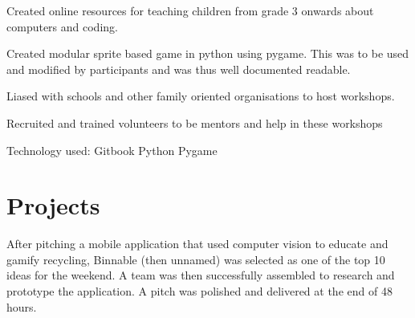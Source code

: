 \documentclass[a4paper]{deedy-resume} %
\begin{document}
\begin{minipage}[t]{0.66\textwidth}
\sectionspace %



\begin{tightitemize}
\item Created online resources for teaching children from grade 3 onwards about computers and coding. \\
\item Created modular sprite based game in python using pygame. This was to be used and modified by participants and was thus well documented readable.\\
\item Liased with schools and other family oriented organisations to host workshops. \\
\item Recruited and trained volunteers to be mentors and help in these workshops \\
\item Technology used: Gitbook \textbullet{} Python \textbullet{} Pygame \\
\end{tightitemize}

\sectionspace %


\section{Projects}


After pitching a mobile application that used computer vision to educate and gamify recycling, Binnable (then unnamed) was selected as one of the top 10 ideas for the weekend. A team was then successfully assembled to research and prototype the application. A pitch was polished and delivered at the end of 48 hours.

\sectionspace %




\end{minipage}
\end{document}
